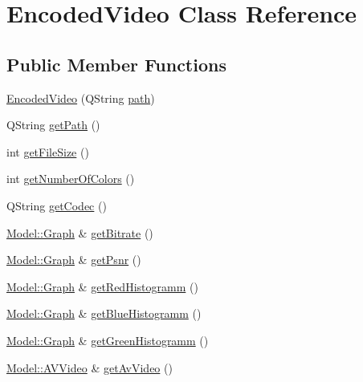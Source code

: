 \hypertarget{classModel_1_1EncodedVideo}{}\section{Encoded\+Video Class Reference}
\label{classModel_1_1EncodedVideo}
\subsection*{Public Member Functions}
\begin{DoxyCompactItemize}
\item 
\hyperlink{classModel_1_1EncodedVideo_a436d811c3c2420e132a2b4e04959c5de}{Encoded\+Video} (Q\+String \hyperlink{classModel_1_1EncodedVideo_a34b772573db9a14b1acb61b24709ae73}{path})
\item 
Q\+String \hyperlink{classModel_1_1EncodedVideo_a1a94d0c9bf9dd725556721ac914025e3}{get\+Path} ()
\item 
int \hyperlink{classModel_1_1EncodedVideo_ac4465cfb146410e557acc4892afd9e7c}{get\+File\+Size} ()
\item 
int \hyperlink{classModel_1_1EncodedVideo_ab9202ba7e871cc8488f73a14e4e6abef}{get\+Number\+Of\+Colors} ()
\item 
Q\+String \hyperlink{classModel_1_1EncodedVideo_ad0b9ca84489c31d0155646495380ac0b}{get\+Codec} ()
\item 
\hyperlink{classModel_1_1Graph}{Model\+::\+Graph} \& \hyperlink{classModel_1_1EncodedVideo_afe6efbe8e2d7312d31f9df848685c2a1}{get\+Bitrate} ()
\item 
\hyperlink{classModel_1_1Graph}{Model\+::\+Graph} \& \hyperlink{classModel_1_1EncodedVideo_a4c4816fa0fc4d120b7ca4727f92b8434}{get\+Psnr} ()
\item 
\hyperlink{classModel_1_1Graph}{Model\+::\+Graph} \& \hyperlink{classModel_1_1EncodedVideo_a2e964007d3803c23555685e582f1f8f8}{get\+Red\+Histogramm} ()
\item 
\hyperlink{classModel_1_1Graph}{Model\+::\+Graph} \& \hyperlink{classModel_1_1EncodedVideo_a665006efad68684718c78c213e081f16}{get\+Blue\+Histogramm} ()
\item 
\hyperlink{classModel_1_1Graph}{Model\+::\+Graph} \& \hyperlink{classModel_1_1EncodedVideo_a85d21a1922c274ff928b8794627fc3f0}{get\+Green\+Histogramm} ()
\item 
\hyperlink{classModel_1_1AVVideo}{Model\+::\+A\+V\+Video} \& \hyperlink{classModel_1_1EncodedVideo_a58bd43e5cbaa711bf19b0c71efbc9834}{get\+Av\+Video} ()
\item 

\end{DoxyCompactItemize}
